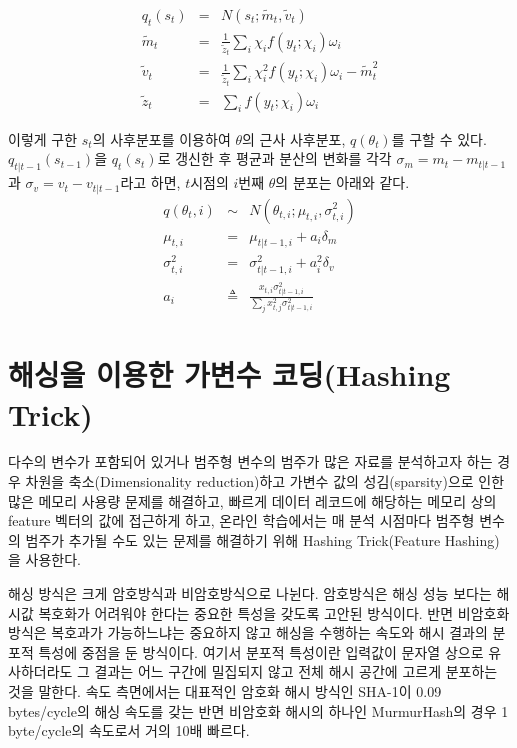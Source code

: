 \documentclass[oneside,b5paper,11pt]{book} %
\begin{document}
\begin{eqnarray}
q_t(s_t) &=& N(s_t; \tilde{m}_t, \tilde{v}_t)
\\ \tilde{m}_t &=& \frac{1}{\tilde{z}_t} \sum_i \chi_i f(y_t; \chi_i ) \omega_i
\\ \tilde{v}_t &=& \frac{1}{\tilde{z}_t} \sum_i \chi^2_i f(y_t; \chi_i ) \omega_i - \tilde{m}^2_t
\\ \tilde{z}_t &=& \sum_i f(y_t; \chi_i ) \omega_i
\end{eqnarray}

이렇게 구한 $s_t$의 사후분포를 이용하여 $\theta$의 근사 사후분포,  $q(\theta_t)$를 구할 수 있다. $q_{t|t-1}(s_{t-1})$을 $q_{t}(s_t)$로 갱신한 후 평균과 분산의 변화를 각각 $\sigma_m = m_t - m_{t|t-1}$과 $\sigma_v = v_t - v_{t|t-1}$라고 하면, $t$시점의 $i$번째 $\theta$의 분포는 아래와 같다.\citep{Murphy2012}
\begin{eqnarray}
   q(\theta_t,i) &\sim& N(\theta_{t,i};\mu_{t,i}, \sigma^2_{t,i})
\\ \mu_{t,i} &=& \mu_{t|t-1,i} + a_i \delta_m
\\ \sigma^2_{t,i} &=& \sigma^2_{t|t-1,i} + a^2_i \delta_v
\\ a_i &\triangleq& \frac{x_{t,i}\sigma^2_{t|t-1,i}}{\sum_j x^2_{t,j}\sigma^2_{t|t-1,i}}
\end{eqnarray}




\section{해싱을 이용한 가변수 코딩(Hashing Trick)}
 다수의 변수가 포함되어 있거나 범주형 변수의 범주가 많은 자료를 분석하고자 하는 경우 차원을 축소(Dimensionality reduction)하고 가변수 값의 성김(sparsity)으로 인한 많은 메모리 사용량 문제를 해결하고, 빠르게 데이터 레코드에 해당하는 메모리 상의 feature 벡터의 값에 접근하게 하고, 온라인 학습에서는 매 분석 시점마다 범주형 변수의 범주가 추가될 수도 있는 문제를 해결하기 위해 Hashing Trick(Feature Hashing)을 사용한다.

 해싱 방식은 크게 암호방식과 비암호방식으로 나뉜다. 암호방식은 해싱 성능 보다는 해시값 복호화가 어려워야 한다는 중요한 특성을 갖도록 고안된 방식이다. 반면 비암호화 방식은 복호과가 가능하느냐는 중요하지 않고 해싱을 수행하는 속도와 해시 결과의 분포적 특성에 중점을 둔 방식이다. 여기서 분포적 특성이란 입력값이 문자열 상으로 유사하더라도 그 결과는 어느 구간에 밀집되지 않고 전체 해시 공간에 고르게 분포하는 것을 말한다.\citep{Ramadhian2013} 속도 측면에서는 대표적인 암호화 해시 방식인 SHA-1이 0.09 bytes/cycle의 해싱 속도를 갖는 반면 비암호화 해시의 하나인 MurmurHash의 경우 1 byte/cycle의 속도로서 거의 10배 빠르다. 
\end{document}
